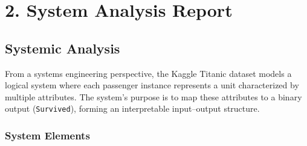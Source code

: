 \documentclass[12pt]{report}
\begin{document}
\section*{2. System Analysis Report}

\subsection*{Systemic Analysis}

From a systems engineering perspective, the Kaggle Titanic dataset models a logical system where each passenger instance represents a unit characterized by multiple attributes. The system’s purpose is to map these attributes to a binary output (\texttt{Survived}), forming an interpretable input–output structure.

\subsubsection*{System Elements}
\end{document}
